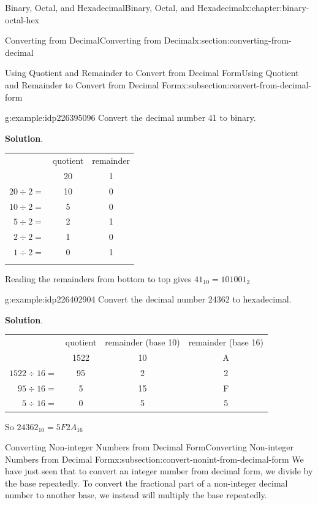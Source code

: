 \documentclass[twoside,10pt,]{book}
\newcommand{\blocktitlefont}{\relax}
\newcommand{\tabularfont}{\relax}
\numberwithin{equation}{section}
\newcommand{\hrulemedium}{\noalign{\hrule height 0.07em}}
\newcommand{\hrulethick} {\noalign{\hrule height 0.11em}}
\begin{document}
\begin{chapterptx}{Binary, Octal, and Hexadecimal}{}{Binary, Octal, and Hexadecimal}{}{}{x:chapter:binary-octal-hex}
\begin{sectionptx}{Converting from Decimal}{}{Converting from Decimal}{}{}{x:section:converting-from-decimal}
\begin{subsectionptx}{Using Quotient and Remainder to Convert from Decimal Form}{}{Using Quotient and Remainder to Convert from Decimal Form}{}{}{x:subsection:convert-from-decimal-form}
\begin{example}{}{g:example:idp226395096}%
Convert the decimal number 41 to binary.\par\smallskip%
\noindent\textbf{\blocktitlefont Solution}.\label{g:solution:idp226397912}{}\hypertarget{g:solution:idp226397912}{}\quad{}\begin{center}%
{\tabularfont%
\begin{tabular}{ccc}\hrulethick
&quotient&remainder\tabularnewline\hrulemedium
\multicolumn{1}{r}{\(41\div 2=\)}&20&1\tabularnewline[0pt]
\multicolumn{1}{r}{\(20\div 2=\)}&10&0\tabularnewline[0pt]
\multicolumn{1}{r}{\(10\div 2 =\)}&5&0\tabularnewline[0pt]
\multicolumn{1}{r}{\(5\div 2=\)}&2&1\tabularnewline[0pt]
\multicolumn{1}{r}{\(2\div 2=\)}&1&0\tabularnewline[0pt]
\multicolumn{1}{r}{\(1\div 2=\)}&0&1\tabularnewline\hrulethick
\end{tabular}
}%
\end{center}%
 Reading the remainders from bottom to top gives \(41_{10}=101001_2\)\end{example}
\begin{example}{}{g:example:idp226402904}%
Convert the decimal number 24362 to hexadecimal.\par\smallskip%
\noindent\textbf{\blocktitlefont Solution}.\label{g:solution:idp226405848}{}\hypertarget{g:solution:idp226405848}{}\quad{}\begin{center}%
{\tabularfont%
\begin{tabular}{cccc}\hrulethick
&quotient&remainder (base 10)&remainder (base 16)\tabularnewline\hrulemedium
\multicolumn{1}{r}{\(24362\div 16=\)}&1522&10&A\tabularnewline[0pt]
\multicolumn{1}{r}{\(1522\div 16=\)}&95&2&2\tabularnewline[0pt]
\multicolumn{1}{r}{\(95\div 16=\)}&5&15&F\tabularnewline[0pt]
\multicolumn{1}{r}{\(5\div 16=\)}&0&5&5
\end{tabular}
}%
\end{center}%
 So \(24362_{10}=5F2A_{16}\)\end{example}
\end{subsectionptx}
%
%
\typeout{************************************************}
\typeout{************************************************}
%
\begin{subsectionptx}{Converting Non-integer Numbers from Decimal Form}{}{Converting Non-integer Numbers from Decimal Form}{}{}{x:subsection:convert-nonint-from-decimal-form}
We have just seen that to convert an integer number from decimal form, we divide by the base repeatedly.  To convert the fractional part of a non-integer decimal number to another base, we instead will multiply the base repeatedly.%

\end{subsectionptx}
\end{sectionptx}
\end{chapterptx}
\end{document}
